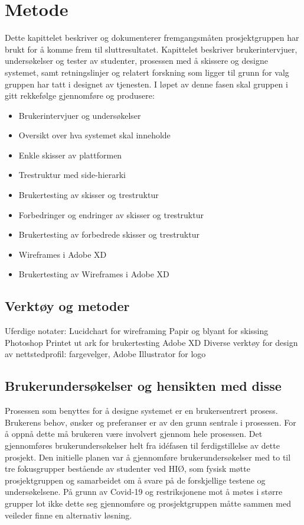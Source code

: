 \cleardoublepage
\chapter{Metode}
\label{chap:method}

Dette kapittelet beskriver og dokumenterer fremgangsmåten prosjektgruppen har brukt for å komme frem til sluttresultatet. Kapittelet beskriver brukerintervjuer, undersøkelser og tester av studenter, prosessen med å skissere og designe systemet, samt retningslinjer og relatert forskning som ligger til grunn for valg gruppen har tatt i designet av tjenesten.
I løpet av denne fasen skal gruppen i gitt rekkefølge gjennomføre og produsere:
\begin{itemize}
\item Brukerintervjuer og undersøkelser
\item Oversikt over hva systemet skal inneholde
\item Enkle skisser av plattformen
\item Trestruktur med side-hierarki
\item Brukertesting av skisser og trestruktur
\item Forbedringer og endringer av skisser og trestruktur
\item Brukertesting av forbedrede skisser og trestruktur
\item Wireframes i Adobe XD
\item Brukertesting av Wireframes i Adobe XD
\end{itemize}
\section{Verktøy og metoder}
Uferdige notater:
Lucidchart for wireframing
Papir og blyant for skissing
Photoshop
Printet ut ark for brukertesting
Adobe XD
Diverse verktøy for design av nettstedprofil: fargevelger, Adobe Illustrator for logo


\section{Brukerundersøkelser og hensikten med disse}
Prosessen som benyttes for å designe systemet er en brukersentrert prosess. Brukerens behov, ønsker og preferanser er av den grunn sentrale i prosessen. For å oppnå dette må brukeren være involvert gjennom hele prosessen. Det gjennomføres brukerundersøkelser helt fra idéfasen til ferdigstillelse av dette prosjekt.
Den initielle planen var å gjennomføre brukerundersøkelser med to til tre fokusgrupper bestående av studenter ved HIØ, som fysisk møtte prosjektgruppen og samarbeidet om å svare på de forskjellige testene og undersøkelsene. På grunn av Covid-19 og restriksjonene mot å møtes i større grupper lot ikke dette seg gjennomføre og prosjektgruppen måtte sammen med veileder finne en alternativ løsning.

